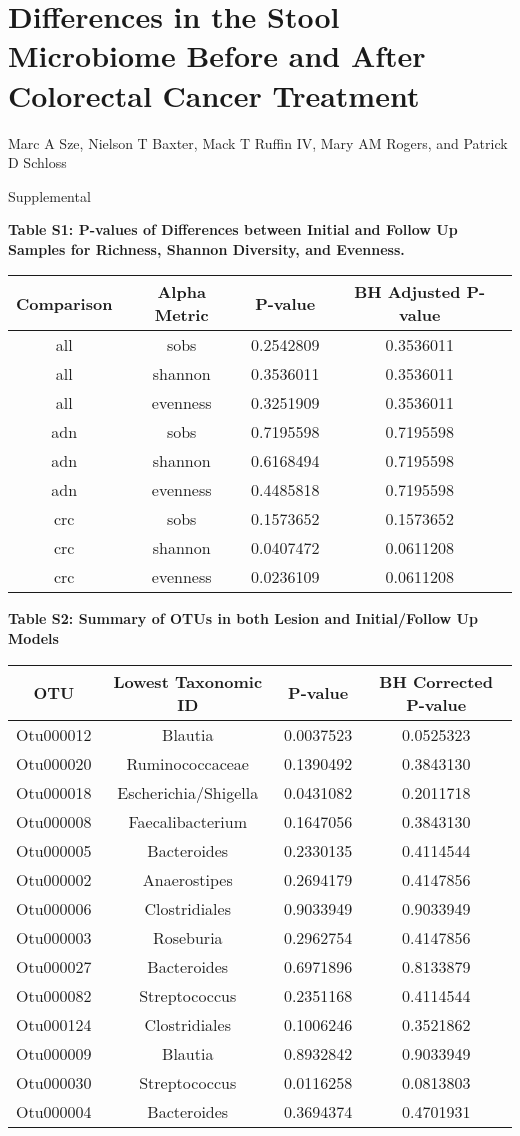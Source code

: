 \documentclass[12pt,]{article}
\title{}
\author{}
\date{}
\begin{document}
\section{Differences in the Stool Microbiome Before and After Colorectal
Cancer
Treatment}\label{differences-in-the-stool-microbiome-before-and-after-colorectal-cancer-treatment}

\vspace{10mm}

\begin{center}
Marc A Sze, Nielson T Baxter, Mack T Ruffin IV, Mary AM Rogers, and Patrick D Schloss

\vspace{10mm}

Supplemental
\end{center}

\newpage

\textbf{Table S1: P-values of Differences between Initial and Follow Up
Samples for Richness, Shannon Diversity, and Evenness.}

\begin{longtable}[]{@{}cccc@{}}
\toprule
Comparison & Alpha Metric & P-value & BH Adjusted P-value\tabularnewline
\midrule
\endhead
all & sobs & 0.2542809 & 0.3536011\tabularnewline
all & shannon & 0.3536011 & 0.3536011\tabularnewline
all & evenness & 0.3251909 & 0.3536011\tabularnewline
adn & sobs & 0.7195598 & 0.7195598\tabularnewline
adn & shannon & 0.6168494 & 0.7195598\tabularnewline
adn & evenness & 0.4485818 & 0.7195598\tabularnewline
crc & sobs & 0.1573652 & 0.1573652\tabularnewline
crc & shannon & 0.0407472 & 0.0611208\tabularnewline
crc & evenness & 0.0236109 & 0.0611208\tabularnewline
\bottomrule
\end{longtable}

\newpage

\textbf{Table S2: Summary of OTUs in both Lesion and Initial/Follow Up
Models}

\begin{longtable}[]{@{}cccc@{}}
\toprule
OTU & Lowest Taxonomic ID & P-value & BH Corrected
P-value\tabularnewline
\midrule
\endhead
Otu000012 & Blautia & 0.0037523 & 0.0525323\tabularnewline
Otu000020 & Ruminococcaceae & 0.1390492 & 0.3843130\tabularnewline
Otu000018 & Escherichia/Shigella & 0.0431082 & 0.2011718\tabularnewline
Otu000008 & Faecalibacterium & 0.1647056 & 0.3843130\tabularnewline
Otu000005 & Bacteroides & 0.2330135 & 0.4114544\tabularnewline
Otu000002 & Anaerostipes & 0.2694179 & 0.4147856\tabularnewline
Otu000006 & Clostridiales & 0.9033949 & 0.9033949\tabularnewline
Otu000003 & Roseburia & 0.2962754 & 0.4147856\tabularnewline
Otu000027 & Bacteroides & 0.6971896 & 0.8133879\tabularnewline
Otu000082 & Streptococcus & 0.2351168 & 0.4114544\tabularnewline
Otu000124 & Clostridiales & 0.1006246 & 0.3521862\tabularnewline
Otu000009 & Blautia & 0.8932842 & 0.9033949\tabularnewline
Otu000030 & Streptococcus & 0.0116258 & 0.0813803\tabularnewline
Otu000004 & Bacteroides & 0.3694374 & 0.4701931\tabularnewline
\bottomrule
\end{longtable}

\newpage
\end{document}
